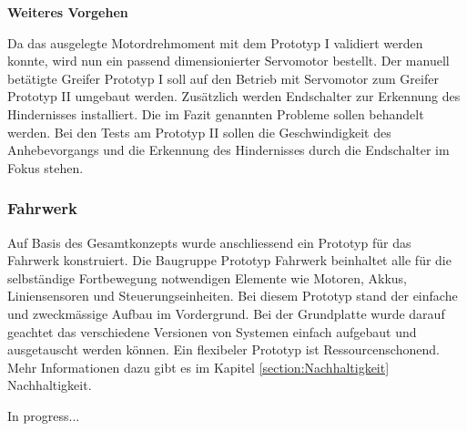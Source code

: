 \textbf{Weiteres Vorgehen}

Da das ausgelegte Motordrehmoment mit dem Prototyp I validiert werden konnte, wird nun ein passend dimensionierter Servomotor bestellt. Der manuell betätigte Greifer Prototyp I soll auf den Betrieb mit Servomotor zum Greifer Prototyp II umgebaut werden. Zusätzlich werden Endschalter zur Erkennung des Hindernisses installiert. Die im Fazit genannten Probleme sollen behandelt werden.
Bei den Tests am Prototyp II sollen die Geschwindigkeit des Anhebevorgangs und die Erkennung des Hindernisses durch die Endschalter im Fokus stehen.


\subsubsection{Fahrwerk}

Auf Basis des Gesamtkonzepts wurde anschliessend ein Prototyp für das Fahrwerk konstruiert. Die Baugruppe Prototyp Fahrwerk beinhaltet alle für die selbständige Fortbewegung notwendigen Elemente wie Motoren, Akkus, Liniensensoren und Steuerungseinheiten.  Bei diesem Prototyp stand der einfache und zweckmässige Aufbau im Vordergrund. Bei der Grundplatte wurde darauf geachtet das verschiedene  Versionen von Systemen einfach aufgebaut und ausgetauscht werden können. Ein flexibeler Prototyp ist Ressourcenschonend. Mehr Informationen dazu gibt es im Kapitel \ref{section:Nachhaltigkeit} Nachhaltigkeit. 

In progress...
